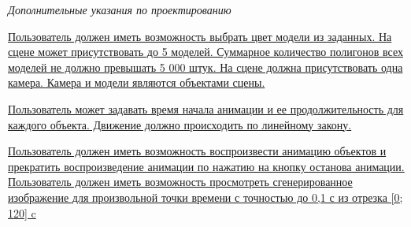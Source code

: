 
\clearpage
{}
\thispagestyle{empty}

\begin{center}
    \fontsize{12pt}{\baselineskip}\selectfont
    \textit{Дополнительные указания по проектированию}
\end{center}

\begingroup
\fontsize{12pt}{0.7\baselineskip}\selectfont
\setlength{\parskip}{0em}
\setlength{\parindent}{0em}

\uline{\mbox{\hspace*{1.25cm}} Пользователь должен иметь возможность выбрать цвет модели из заданных. На сцене может присутствовать до 5 моделей. Суммарное количество полигонов всех моделей не должно превышать 5 000 штук. На сцене должна присутствовать одна камера. Камера и модели являются объектами сцены. 
    \hfill
}

\uline{\mbox{\hspace*{1.25cm}} Пользователь может задавать время начала анимации и ее продолжительность для каждого объекта. Движение должно происходить по линейному закону.\hfill}


\uline{\mbox{\hspace*{1.25cm}} Пользователь должен иметь возможность воспроизвести анимацию объектов и прекратить воспроизведение анимации по нажатию на кнопку останова анимации. Пользователь должен иметь возможность просмотреть сгенерированное изображение для произвольной точки времени с точностью до 0,1 с из отрезка [0; 120] c \hfill}


\endgroup
\normalsize
\restoregeometry
